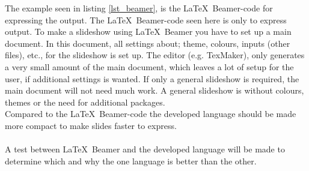 The example seen in listing \ref{lst_beamer}, is the \LaTeX~Beamer-code for expressing the output. The \LaTeX~Beamer-code seen here is only to express output. To make a slideshow using \LaTeX~Beamer you have to set up a main document. In this document, all settings about; theme, colours, inputs (other files), etc., for the slideshow is set up. The editor (e.g. TexMaker), only generates a very small amount of the main document, which leaves a lot of setup for the user, if additional settings is wanted. If only a general slideshow is required, the main document will not need much work. A general slideshow is without colours, themes or the need for additional packages.\\
Compared to the \LaTeX~Beamer-code the developed language should be made more compact to make slides faster to express.
\\ \\
A test between \LaTeX~Beamer and the developed language will be made to determine which and why the one language is better than the other.
